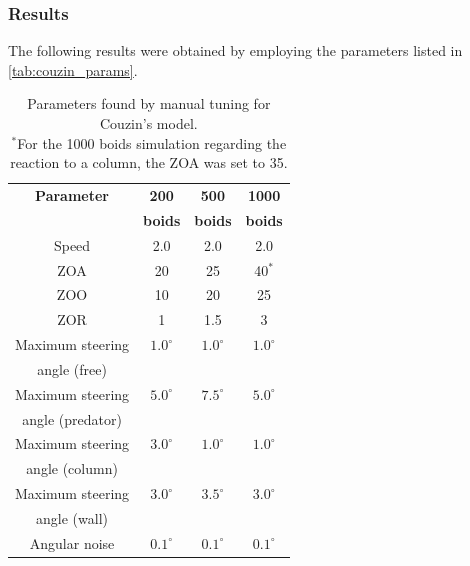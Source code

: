 \subsubsection{Results}
The following results were obtained by employing the parameters listed in \autoref{tab:couzin_params}.
\begin{table}[ht]
    \centering
    \begin{tabular}{|c|c|c|c|}
        \hline
        \textbf{Parameter} & \textbf{200}   & \textbf{500}   & \textbf{1000}  \\
                           & \textbf{boids} & \textbf{boids} & \textbf{boids} \\ \hline
        Speed              & 2.0            & 2.0            & 2.0            \\ \hline
        ZOA                & 20             & 25             & 40$^*$         \\ \hline
        ZOO                & 10             & 20             & 25             \\ \hline
        ZOR                & 1              & 1.5            & 3              \\ \hline
        Maximum steering   & $1.0^\circ$    & $1.0^\circ$    & $1.0^\circ$    \\ \hline
        angle (free)       &                &                &                \\ \hline
        Maximum steering   & $5.0^\circ$    & $7.5^\circ$    & $5.0^\circ$    \\ \hline
        angle (predator)   &                &                &                \\ \hline
        Maximum steering   & $3.0^\circ$    & $1.0^\circ$    & $1.0^\circ$    \\ \hline
        angle (column)     &                &                &                \\ \hline
        Maximum steering   & $3.0^\circ$    & $3.5^\circ$    & $3.0^\circ$    \\ \hline
        angle (wall)       &                &                &                \\ \hline
        Angular noise      & $0.1^\circ$    & $0.1^\circ$    & $0.1^\circ$    \\ \hline
    \end{tabular}
    \caption{Parameters found by manual tuning for Couzin's model. \\
        $^*$For the 1000 boids simulation regarding the reaction to a column, the ZOA was set to 35.}
    \label{tab:couzin_params}
\end{table}
